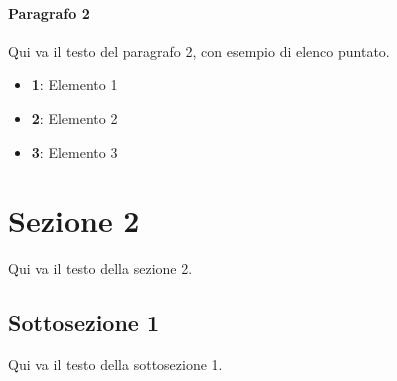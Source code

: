 \documentclass[italian,12pt]{article}
\begin{document}
\paragraph{Paragrafo 2}
Qui va il testo del paragrafo 2, con esempio di elenco puntato.
\begin{itemize}
	\itemsep0em
	\item \textbf{1}: Elemento 1
	\item \textbf{2}: Elemento 2
	\item \textbf{3}: Elemento 3
\end{itemize}



\section{Sezione 2}
Qui va il testo della sezione 2.
\subsection{Sottosezione 1}
Qui va il testo della sottosezione 1.
\end{document}
